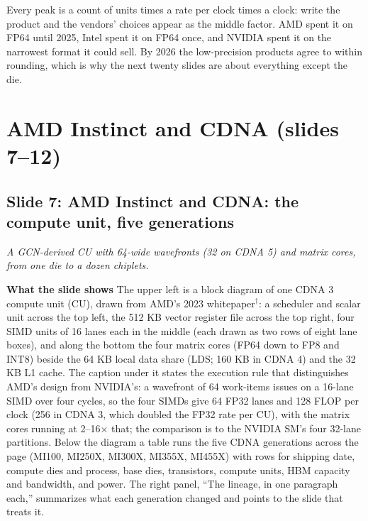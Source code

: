 \documentclass[11pt,letterpaper]{article}
\newcommand{\setstage}[1]{\colorlet{stagec}{#1}}
\newcommand{\slide}[3]{%
  \subsection[Slide #1: #2]{Slide #1: #2}%
  {\color{muted}\itshape #3\par}\medskip}
\newcommand{\para}[1]{\medskip\noindent\textbf{#1}\quad}
\newenvironment{intuition}{\begin{tcolorbox}[intuitionbox]}{\end{tcolorbox}}
\begin{document}
\begin{intuition}
Every peak is a count of units times a rate per clock times a clock: write the product and the vendors' choices appear as the middle factor. AMD spent it on FP64 until 2025, Intel spent it on FP64 once, and NVIDIA spent it on the narrowest format it could sell. By 2026 the low-precision products agree to within rounding, which is why the next twenty slides are about everything except the die.
\end{intuition}

\setstage{emb}
\section{AMD Instinct and CDNA (slides 7--12)}

\slide{7}{AMD Instinct and CDNA: the compute unit, five generations}{A GCN-derived CU with 64-wide wavefronts (32 on CDNA 5) and matrix cores, from one die to a dozen chiplets.}

\para{What the slide shows} The upper left is a block diagram of one CDNA 3 compute unit (CU), drawn from AMD's 2023 whitepaper$^\dagger$: a scheduler and scalar unit across the top left, the 512 KB vector register file across the top right, four SIMD units of 16 lanes each in the middle (each drawn as two rows of eight lane boxes), and along the bottom the four matrix cores (FP64 down to FP8 and INT8) beside the 64 KB local data share (LDS; 160 KB in CDNA 4) and the 32 KB L1 cache. The caption under it states the execution rule that distinguishes AMD's design from NVIDIA's: a wavefront of 64 work-items issues on a 16-lane SIMD over four cycles, so the four SIMDs give 64 FP32 lanes and 128 FLOP per clock (256 in CDNA 3, which doubled the FP32 rate per CU), with the matrix cores running at 2--16$\times$ that; the comparison is to the NVIDIA SM's four 32-lane partitions. Below the diagram a table runs the five CDNA generations across the page (MI100, MI250X, MI300X, MI355X, MI455X) with rows for shipping date, compute dies and process, base dies, transistors, compute units, HBM capacity and bandwidth, and power. The right panel, ``The lineage, in one paragraph each,'' summarizes what each generation changed and points to the slide that treats it.
\end{document}

